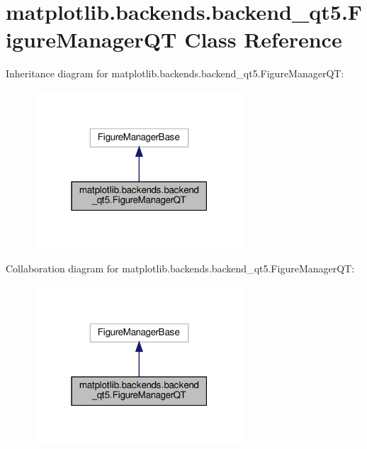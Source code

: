 \hypertarget{classmatplotlib_1_1backends_1_1backend__qt5_1_1FigureManagerQT}{}\section{matplotlib.\+backends.\+backend\+\_\+qt5.\+Figure\+Manager\+QT Class Reference}
\label{classmatplotlib_1_1backends_1_1backend__qt5_1_1FigureManagerQT}


Inheritance diagram for matplotlib.\+backends.\+backend\+\_\+qt5.\+Figure\+Manager\+QT\+:
\nopagebreak
\begin{figure}[H]
\begin{center}
\leavevmode
\includegraphics[width=223pt]{classmatplotlib_1_1backends_1_1backend__qt5_1_1FigureManagerQT__inherit__graph}
\end{center}
\end{figure}


Collaboration diagram for matplotlib.\+backends.\+backend\+\_\+qt5.\+Figure\+Manager\+QT\+:
\nopagebreak
\begin{figure}[H]
\begin{center}
\leavevmode
\includegraphics[width=223pt]{classmatplotlib_1_1backends_1_1backend__qt5_1_1FigureManagerQT__coll__graph}
\end{center}
\end{figure}
